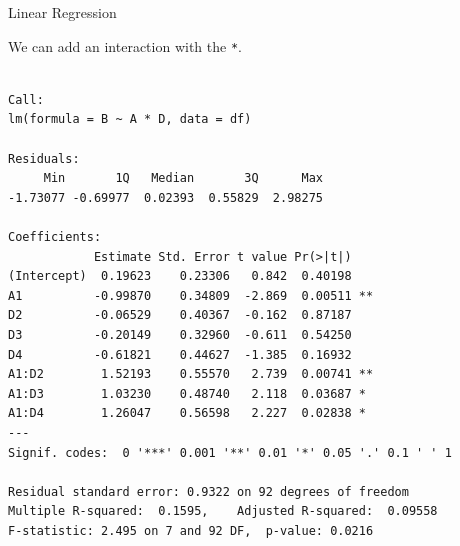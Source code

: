 \begin{frame}[fragile]{Linear Regression}

We can add an interaction with the \texttt{*}. \small

\begin{Shaded}
\begin{Highlighting}[]
\StringTok{ }\OperatorTok{~}\StringTok{ }\OperatorTok{*}
\end{Highlighting}
\end{Shaded}

\begin{verbatim}

Call:
lm(formula = B ~ A * D, data = df)

Residuals:
     Min       1Q   Median       3Q      Max 
-1.73077 -0.69977  0.02393  0.55829  2.98275 

Coefficients:
            Estimate Std. Error t value Pr(>|t|)   
(Intercept)  0.19623    0.23306   0.842  0.40198   
A1          -0.99870    0.34809  -2.869  0.00511 **
D2          -0.06529    0.40367  -0.162  0.87187   
D3          -0.20149    0.32960  -0.611  0.54250   
D4          -0.61821    0.44627  -1.385  0.16932   
A1:D2        1.52193    0.55570   2.739  0.00741 **
A1:D3        1.03230    0.48740   2.118  0.03687 * 
A1:D4        1.26047    0.56598   2.227  0.02838 * 
---
Signif. codes:  0 '***' 0.001 '**' 0.01 '*' 0.05 '.' 0.1 ' ' 1

Residual standard error: 0.9322 on 92 degrees of freedom
Multiple R-squared:  0.1595,    Adjusted R-squared:  0.09558 
F-statistic: 2.495 on 7 and 92 DF,  p-value: 0.0216
\end{verbatim}

\end{frame}


